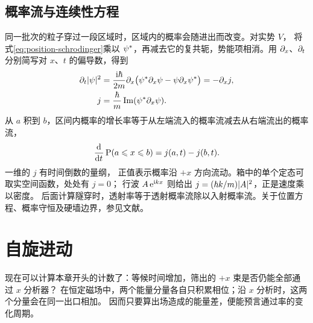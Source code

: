 \subsection{概率流与连续性方程}
\label{ss:position-current}
同一批次的粒子穿过一段区域时，区域内的概率会随进出而改变。对实势 $V$，
将式\eqref{eq:position-schrodinger}乘以 $\psi^\ast$，再减去它的复共轭，势能项相消。用 $\partial_x$、$\partial_t$ 分别简写对 $x$、$t$ 的偏导数，得到
\begin{subequations}
    \begin{align}
        \partial_t\lvert\psi\rvert^2
        &= \frac{\mathrm{i}\hbar}{2m}\partial_x
          \bigl(\psi^\ast\partial_x\psi - \psi\partial_x\psi^\ast\bigr)
        = -\partial_x j,\\
        j &= \frac{\hbar}{m}\operatorname{Im}(\psi^\ast\partial_x\psi). \label{eq:position-current}
    \end{align}
\end{subequations}
从 $a$ 积到 $b$，区间内概率的增长率等于从左端流入的概率流减去从右端流出的概率流，
\begin{equation}
    \frac{\mathop{}\!\mathrm{d}^{}}{\mathrm{d}{t}^{}}\operatorname{P}(a\leqslant x\leqslant b) = j(a,t) - j(b,t).
\end{equation}
一维的 $j$ 有时间倒数的量纲，
正值表示概率沿 $+x$ 方向流动。箱中的单个定态可取实空间函数，处处有 $j = 0$；
行波 $A\mathop{}\!\mathrm{e}^{\mathrm{i} kx}$ 则给出 $j = (\hbar k/m)\lvert A\rvert^2$，正是速度乘以密度。
后面计算隧穿时，透射率等于透射概率流除以入射概率流。关于位置方程、概率守恒及硬墙边界，参见文献\cite{mitwave}。

\section{自旋进动}
现在可以计算本章开头的计数了：等候时间增加，筛出的 $+x$ 束是否仍能全部通过 $x$ 分析器？
在恒定磁场中，两个能量分量各自只积累相位；沿 $x$ 分析时，这两个分量会在同一出口相加。
因而只要算出场造成的能量差，便能预言通过率的变化周期。

